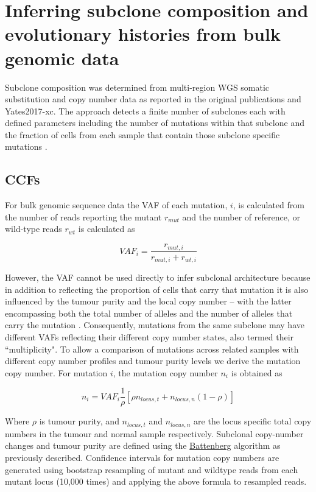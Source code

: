 \section{Inferring subclone composition and evolutionary histories from bulk genomic data}
\label{sec:protocol-suppl-evo-history}

Subclone composition was determined from multi-region \ac{WGS} somatic substitution and copy number data as reported in the original publications \textcite{Yates2015-xk} and {Yates2017-xc}. The approach detects a finite number of subclones each with defined parameters including the number of mutations within that subclone and the fraction of cells from each sample that contain those subclone specific mutations .

\subsection{\aclp{CCF}}

For bulk genomic sequence data the \acf{VAF} of each mutation, $i$, is calculated from the number of reads reporting the mutant $r_{mut}$ and the number of reference, or wild-type reads $r_{wt}$ is calculated as

\begin{equation}
    VAF_i = \frac{r_{mut,i}}{r_{mut,i} + r_{wt,i}}
\end{equation}

However, the \ac{VAF} cannot be used directly to infer subclonal architecture because in addition to reflecting the proportion of cells that carry that mutation it is also influenced by the tumour purity and the local copy number – with the latter encompassing both the total number of alleles and the number of alleles that carry the mutation \parencite{Dentro2017-jb}. Consequently, mutations from the same subclone may have different \acp{VAF} reflecting their different copy number states, also termed their ``multiplicity". To allow a comparison of mutations across related samples with different copy number profiles and tumour purity levels we derive the mutation copy number. For mutation $i$, the mutation copy number $n_i$ is obtained as

\begin{equation}
    n_i = VAF_i\frac{1}{\rho}\left[\rho n_{locus,t} + n_{locus,n}(1-\rho)\right]
\end{equation}

Where $\rho$ is tumour purity, and $n_{locus,t}$ and $n_{locus,n}$ are the locus specific total copy numbers in the tumour and normal sample respectively. Subclonal copy-number changes and tumour purity are defined using the \href{https://github.com/cancerit/cgpBattenberg}{Battenberg} algorithm as previously described. Confidence intervals for mutation copy numbers are generated using bootstrap resampling of mutant and wildtype reads from each mutant locus (10,000 times) and applying the above formula to resampled reads. 

